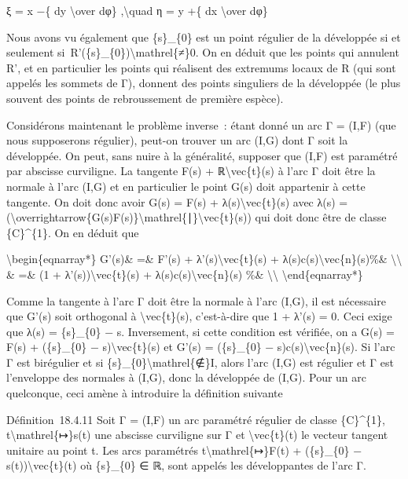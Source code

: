 \documentclass[]{article}
\begin{document}
ξ = x −\{ dy \textbackslash{}over dφ\} ,\textbackslash{}quad η = y +\{
dx \textbackslash{}over dφ\}

Nous avons vu également que \{s\}\_\{0\} est un point régulier de la
développée si et seulement
si~R'(\{s\}\_\{0\})\textbackslash{}mathrel\{≠\}0. On en déduit que les
points qui annulent R', et en particulier les points qui réalisent des
extremums locaux de R (qui sont appelés les sommets de Γ), donnent des
points singuliers de la développée (le plus souvent des points de
rebroussement de première espèce).

Considérons maintenant le problème inverse~: étant donné un arc Γ =
(I,F) (que nous supposerons régulier), peut-on trouver un arc (I,G) dont
Γ soit la développée. On peut, sans nuire à la généralité, supposer que
(I,F) est paramétré par abscisse curviligne. La tangente F(s) +
ℝ\textbackslash{}vec\{t\}(s) à l'arc Γ doit être la normale à l'arc
(I,G) et en particulier le point G(s) doit appartenir à cette tangente.
On doit donc avoir G(s) = F(s) + λ(s)\textbackslash{}vec\{t\}(s) avec
λ(s) =
(\textbackslash{}overrightarrow\{G(s)F(s)\}\textbackslash{}mathrel\{∣\}\textbackslash{}vec\{t\}(s))
qui doit donc être de classe \{C\}\^{}\{1\}. On en déduit que

\textbackslash{}begin\{eqnarray*\} G'(s)\& =\& F'(s) +
λ'(s)\textbackslash{}vec\{t\}(s) +
λ(s)c(s)\textbackslash{}vec\{n\}(s)\%\& \textbackslash{}\textbackslash{}
\& =\& (1 + λ'(s))\textbackslash{}vec\{t\}(s) +
λ(s)c(s)\textbackslash{}vec\{n\}(s) \%\&
\textbackslash{}\textbackslash{} \textbackslash{}end\{eqnarray*\}

Comme la tangente à l'arc Γ doit être la normale à l'arc (I,G), il est
nécessaire que G'(s) soit orthogonal à \textbackslash{}vec\{t\}(s),
c'est-à-dire que 1 + λ'(s) = 0. Ceci exige que λ(s) = \{s\}\_\{0\} − s.
Inversement, si cette condition est vérifiée, on a G(s) = F(s) +
(\{s\}\_\{0\} − s)\textbackslash{}vec\{t\}(s) et G'(s) = (\{s\}\_\{0\} −
s)c(s)\textbackslash{}vec\{n\}(s). Si l'arc Γ est birégulier et si
\{s\}\_\{0\}\textbackslash{}mathrel\{∉\}I, alors l'arc (I,G) est
régulier et Γ est l'enveloppe des normales à (I,G), donc la développée
de (I,G). Pour un arc quelconque, ceci amène à introduire la définition
suivante

Définition~18.4.11 Soit Γ = (I,F) un arc paramétré régulier de classe
\{C\}\^{}\{1\}, t\textbackslash{}mathrel\{↦\}s(t) une abscisse
curviligne sur Γ et \textbackslash{}vec\{t\}(t) le vecteur tangent
unitaire au point t. Les arcs paramétrés
t\textbackslash{}mathrel\{↦\}F(t) + (\{s\}\_\{0\} −
s(t))\textbackslash{}vec\{t\}(t) où \{s\}\_\{0\} ∈ ℝ, sont appelés les
développantes de l'arc Γ.
\end{document}
